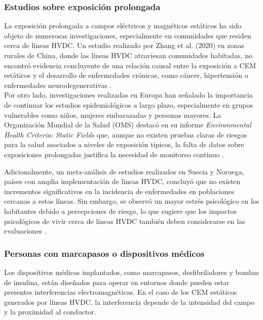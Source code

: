 \subsubsection{Estudios sobre exposición prolongada}

La exposición prolongada a campos eléctricos y magnéticos estáticos ha sido objeto de numerosas investigaciones, especialmente en comunidades que residen cerca de líneas HVDC. Un estudio realizado por Zhang et al. (2020) en zonas rurales de China, donde las líneas HVDC atraviesan comunidades habitadas, no encontró evidencia concluyente de una relación causal entre la exposición a CEM estáticos y el desarrollo de enfermedades crónicas, como cáncer, hipertensión o enfermedades neurodegenerativas \cite{Zhang2020HVDCHealth}.\\

Por otro lado, investigaciones realizadas en Europa han señalado la importancia de continuar los estudios epidemiológicos a largo plazo, especialmente en grupos vulnerables como niños, mujeres embarazadas y personas mayores. La Organización Mundial de la Salud (OMS) destacó en su informe \textit{Environmental Health Criteria: Static Fields} que, aunque no existen pruebas claras de riesgos para la salud asociados a niveles de exposición típicos, la falta de datos sobre exposiciones prolongadas justifica la necesidad de monitoreo continuo \cite{WHO2006StaticFields}.

Adicionalmente, un meta-análisis de estudios realizados en Suecia y Noruega, países con amplia implementación de líneas HVDC, concluyó que no existen incrementos significativos en la incidencia de enfermedades en poblaciones cercanas a estas líneas. Sin embargo, se observó un mayor estrés psicológico en los habitantes debido a percepciones de riesgo, lo que sugiere que los impactos psicológicos de vivir cerca de líneas HVDC también deben considerarse en las evaluaciones \cite{Sweden2020MetaAnalysis}.

\subsubsection{Personas con marcapasos o dispositivos médicos}

Los dispositivos médicos implantados, como marcapasos, desfibriladores y bombas de insulina, están diseñados para operar en entornos donde pueden estar presentes interferencias electromagnéticas. En el caso de los CEM estáticos generados por líneas HVDC, la interferencia depende de la intensidad del campo y la proximidad al conductor.\\

